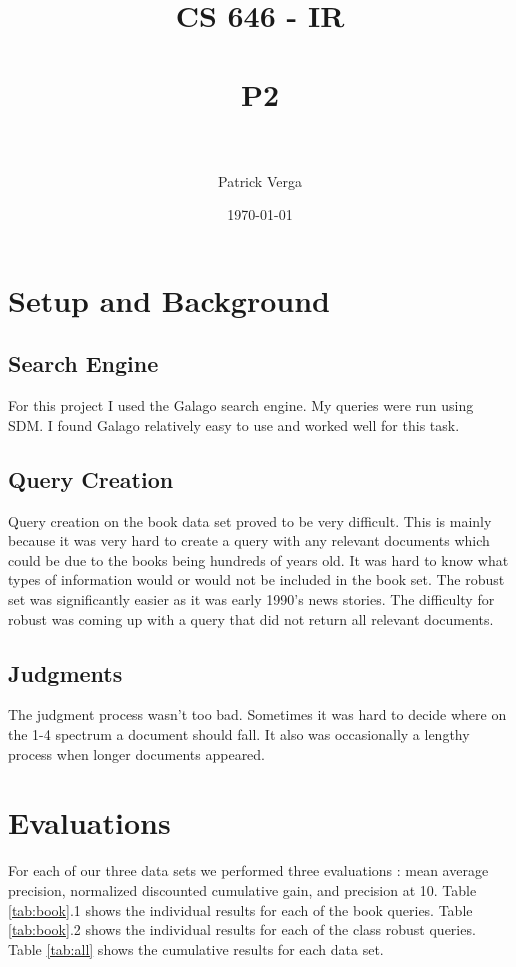 \documentclass[paper=a4, fontsize=11pt]{scrartcl} %
\title{	
\normalfont \normalsize 
\textsc{CS 646 - IR} \\ [25pt] %
\horrule{0.5pt} \\[0.4cm] %
\huge P2 \\ %
\horrule{2pt} \\[0.5cm] %
}
\author{Patrick Verga} %
\date{\normalsize\today} %
\numberwithin{equation}{section} %
\numberwithin{figure}{section} %
\numberwithin{table}{section} %
\begin{document}
\maketitle %


\section {Setup and Background}

\subsection{Search Engine}
For this project I used the Galago search engine. My queries were run using SDM. I found Galago relatively easy to use and worked well for this task. 

\subsection{Query Creation}
Query creation on the book data set proved to be very difficult. This is mainly because it was very hard to create a query with any relevant documents which could be due to the books being hundreds of years old. It was hard to know what types of information would or would not be included in the book set.
The robust set was significantly easier as it was early 1990's news stories. The difficulty for robust was coming up with a query that did not return all relevant documents.

\subsection{Judgments}
The judgment process wasn't too bad. Sometimes it was hard to decide where on the 1-4 spectrum a document should fall. It also was occasionally a lengthy process when longer documents appeared.


\section {Evaluations}
For each of our three data sets we performed three evaluations : mean average precision, normalized discounted cumulative gain, and precision at 10. Table \ref{tab:book}.1 shows the individual results for each of the book queries. Table \ref{tab:book}.2 shows the individual results for each of the class robust queries. Table \ref{tab:all} shows the cumulative results for each data set.
\end{document}
